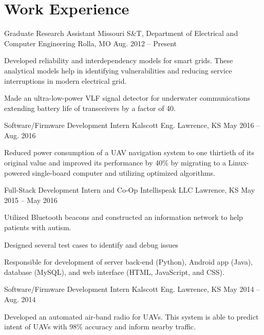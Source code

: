 \section{Work Experience}
\begin{cventries}
  \cventry
    {Graduate Research Assistant}
    {Missouri S\&T, Department of Electrical and Computer Engineering}
    {Rolla, MO}
    {Aug. 2012 -- Present}
    {
      \begin{cvitems}
        \item Developed reliability and interdependency models for smart grids. These analytical models help in identifying vulnerabilities and reducing service interruptions in modern electrical grid.
        \item Made an ultra-low-power VLF signal detector for underwater communications extending battery life of transceivers by a factor of 40.
      \end{cvitems}
    }
  \cventry
    {Software/Firmware Development Intern}
    {Kalscott Eng.}
    {Lawrence, KS}
    {May 2016 -- Aug. 2016}
    {
      \begin{cvitems}
        \item Reduced power consumption of a UAV navigation system to one thirtieth of its original value and improved its performance by 40\% by migrating to a Linux-powered single-board computer and utilizing optimized algorithms.
      \end{cvitems}
    }
  \cventry
    {Full-Stack Development Intern and Co-Op}
    {Intellispeak LLC}
    {Lawrence, KS}
    {May 2015 -- May 2016}
    {
      \begin{cvitems}
        \item Utilized Bluetooth beacons and constructed an information network to help patients with autism.
        \item Designed several test cases to identify and debug issues
        \item Responsible for development of server back-end (Python), Android app (Java), database (MySQL), and web interface (HTML, JavaScript, and CSS).
      \end{cvitems}
    }
  \cventry
    {Software/Firmware Development Intern}
    {Kalscott Eng.}
    {Lawrence, KS}
    {May 2014 -- Aug. 2014}
    {
      \begin{cvitems}
        \item Developed an automated air-band radio for UAVs. This system is able to predict intent of UAVs with 98\% accuracy and inform nearby traffic.

\end{cvitems}}
\end{cventries}
